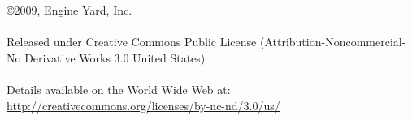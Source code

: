 \documentclass{book}
\begin{document}
\pagestyle{empty}

\cleardoublepage

\copyright 2009, Engine Yard, Inc.\\
\\
Released under Creative Commons Public License (Attribution-Noncommercial-No Derivative Works 3.0 United States)\\
\\
Details available on the World Wide Web at:\\
\url{http://creativecommons.org/licenses/by-nc-nd/3.0/us/}
\cleardoublepage

\pagestyle{headings}



\end{document}
